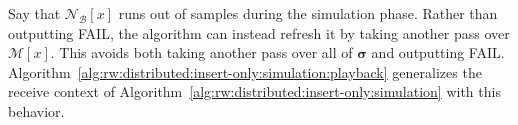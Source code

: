 \documentclass[10]{article}
\newcommand{\push}[1]{\text{push} \left ( #1 \right )}
\newcommand{\algoname}[1]{\textnormal{\textsc{#1}}}
\begin{document}
\begin{algorithm}[htbp]
\begin{flushleft}
\begin{algorithmic}[1]
\end{algorithmic}
\end{flushleft}
\end{algorithm}

Say that $\mathcal{N}_\mathcal{B}[x]$ runs out of samples during the simulation phase. 
Rather than outputting FAIL, the algorithm can instead refresh it by taking another pass over $\mathcal{M}[x]$.
This avoids both taking another pass over all of $\boldsymbol{\sigma}$ and outputting FAIL.
Algorithm~\ref{alg:rw:distributed:insert-only:simulation:playback} generalizes the receive context of Algorithm~\ref{alg:rw:distributed:insert-only:simulation} with this behavior.
\end{document}
